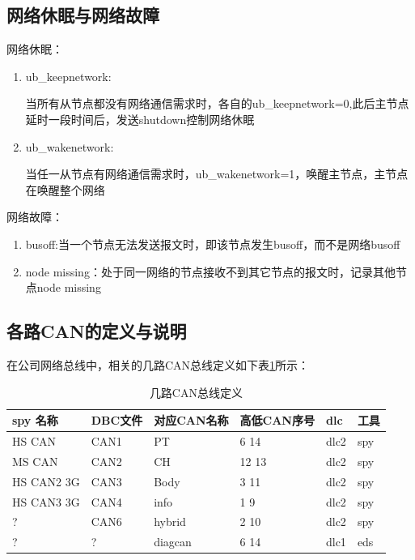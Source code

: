 \subsection{网络休眠与网络故障}
网络休眠：
\begin{enumerate}
    \item ub\_keepnetwork:
    
    当所有从节点都没有网络通信需求时，各自的ub\_keepnetwork=0,此后主节点延时一段时间后，发送shutdown控制网络休眠
    \item ub\_wakenetwork:
    
    当任一从节点有网络通信需求时，ub\_wakenetwork=1，唤醒主节点，主节点在唤醒整个网络
\end{enumerate}

网络故障：
\begin{enumerate}
    \item busoff:当一个节点无法发送报文时，即该节点发生busoff，而不是网络busoff
    \item node missing：处于同一网络的节点接收不到其它节点的报文时，记录其他节点node missing
\end{enumerate}

\subsection{各路CAN的定义与说明}
在公司网络总线中，相关的几路CAN总线定义如下表\ref{tab:canbus_def}所示：
\begin{table}[htbp]
    \centering
    \caption{几路CAN总线定义}
      \begin{tabular}{llllll}
      \toprule
      spy 名称 & DBC文件 & 对应CAN名称 & 高低CAN序号 & dlc   & 工具 \\
      \midrule
      HS CAN & CAN1  & PT    & 6 14  & dlc2  & spy \\
      MS CAN & CAN2  & CH    & 12 13 & dlc2  & spy \\
      HS CAN2 3G & CAN3  & Body  & 3 11  & dlc2  & spy \\
      HS CAN3 3G & CAN4  & info  & 1 9   & dlc2  & spy \\
      ?     & CAN6  & hybrid & 2 10  & dlc2  & spy \\
      ?     & ?     & diagcan & 6 14  & dlc1  & eds \\
      \bottomrule
      \end{tabular}%
    \label{tab:canbus_def}%
  \end{table}%
    

